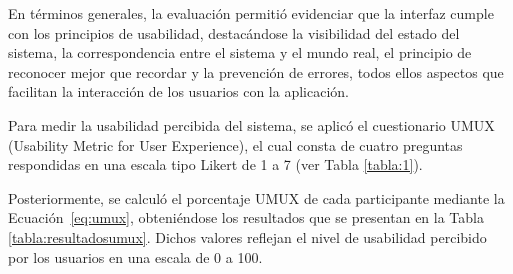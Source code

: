 \documentclass[spanish]{ieee_upb}
\begin{document}
En términos generales, la evaluación permitió evidenciar que la interfaz cumple con los principios de usabilidad, destacándose la visibilidad del estado del sistema, la correspondencia entre el sistema y el mundo real, el principio de reconocer mejor que recordar y la prevención de errores, todos ellos aspectos que facilitan la interacción de los usuarios con la aplicación.
\vspace{0.3 cm}

Para medir la usabilidad percibida del sistema, se aplicó el cuestionario UMUX (Usability Metric for User Experience), el cual consta de cuatro preguntas respondidas en una escala tipo Likert de 1 a 7 (ver Tabla \ref{tabla:1}).
\vspace{0.3 cm}

Posteriormente, se calculó el porcentaje UMUX de cada participante mediante la Ecuación~\ref{eq:umux}, obteniéndose los resultados que se presentan en la Tabla \ref{tabla:resultadosumux}. Dichos valores reflejan el nivel de usabilidad percibido por los usuarios en una escala de 0 a 100.
\end{document}
